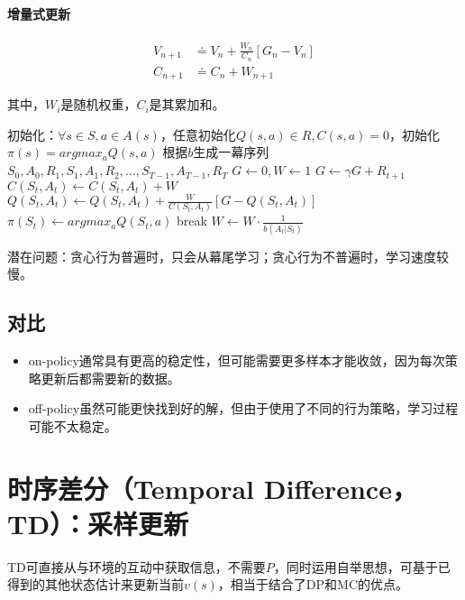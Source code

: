\documentclass[
12pt, %
a4paper, 
oneside, %
headinclude,footinclude, %
]{scrartcl}
\begin{document}
\paragraph{增量式更新}
\begin{align*}
V_{n + 1} &\doteq V_n + \frac{W_n}{C_n}[G_n - V_n] \\
C_{n + 1} &\doteq C_n + W_{n + 1}
\end{align*}

其中，$ W_i $是随机权重，$ C_i $是其累加和。
\begin{myalgorithm}
\State 初始化：$ \forall s \in S, a \in A(s) $，任意初始化$ Q(s,a) \in R, C(s,a) = 0 $，初始化$ \pi(s) = argmax_a Q(s,a) $ 
\Loop
\State 根据$ b $生成一幕序列$ S_0,A_0,R_1,S_1,A_1,R_2,\dots,S_{T - 1},A_{T - 1},R_T $ 
\State $ G \gets 0, W \gets 1 $
\State $ G \gets \gamma G + R_{t + 1} $
\State $ C(S_t,A_t) \gets C(S_t,A_t) + W $
\State $ Q(S_t,A_t) \gets Q(S_t,A_t) + \frac{W}{C(S_t,A_t)}[G - Q(S_t,A_t)] $
\State $ \pi(S_t) \gets argmax_a Q(S_t,a) $
\State break 
\EndIf
\State $ W \gets W \cdot \frac{1}{b(A_t|S_t)} $ 
\EndFor
\EndLoop
\end{myalgorithm}

潜在问题：贪心行为普遍时，只会从幕尾学习；贪心行为不普遍时，学习速度较慢。
\subsection{对比}
\begin{itemize}
\item on-policy通常具有更高的稳定性，但可能需要更多样本才能收敛，因为每次策略更新后都需要新的数据。
\item off-policy虽然可能更快找到好的解，但由于使用了不同的行为策略，学习过程可能不太稳定。
\end{itemize}
\section{时序差分（Temporal Difference，TD）：采样更新}
TD可直接从与环境的互动中获取信息，不需要$ P $，同时运用自举思想，可基于已得到的其他状态估计来更新当前$ v(s) $，相当于结合了DP和MC的优点。
\end{document}
